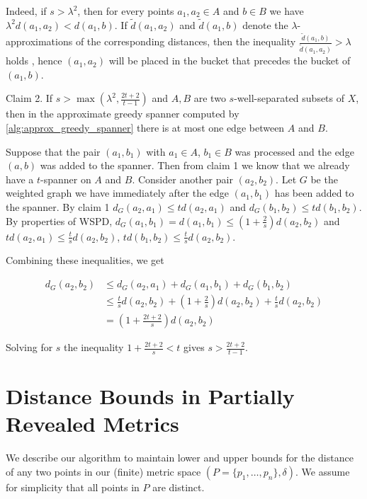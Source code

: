 \documentclass[10pt]{article}
\newcommand{\dappr}{\tilde{d}}
\newcommand{\metric}{\delta}
\begin{document}
Indeed, if $s > \lambda^2$, then for every points $a_1, a_2 \in A$ and $b \in B$
we have $\lambda^2 d(a_1, a_2) < d(a_1, b)$. If $\dappr(a_1, a_2)$ and $\dappr(a_1, b)$ denote the $\lambda$-approximations
of the corresponding distances, then the inequality $\frac{\dappr(a_1, b)}{\dappr(a_1, a_2)} > \lambda$
holds , hence $(a_1, a_2)$ will be placed in the bucket that precedes the bucket of $(a_1, b)$.


Claim 2. If $s > \max(\lambda^2, \frac{2t+2}{t-1})$ and $A, B$ are two $s$-well-separated subsets of $X$,
then in the approximate greedy spanner computed by \ref{alg:approx_greedy_spanner} there is at most one edge between $A$ and $B$.

Suppose that the pair $(a_1, b_1)$ with $a_1 \in A$, $b_1 \in B$ was processed and the edge $(a, b)$
was added to the spanner. Then from claim 1 we know that we already have a $t$-spanner on $A$ and $B$.
Consider another pair $(a_2, b_2)$. Let $G$ be the weighted graph we have immediately after the edge $(a_1, b_1)$ has been added
to the spanner. By claim 1
$d_G(a_2, a_1) \leq td(a_2, a_1)$ and $d_G(b_1, b_2) \leq t d(b_1, b_2)$.
By properties of WSPD, $d_G(a_1, b_1) = d(a_1, b_1) \leq (1 + \frac{2}{s})d(a_2, b_2)$
and $t d(a_2, a_1) \leq \frac{t}{s} d(a_2, b_2)$, $t d(b_1, b_2) \leq \frac{t}{s} d(a_2, b_2)$.

Combining these inequalities, we get

\begin{equation}
    \begin{split}
        d_G(a_2, b_2) & \leq  d_G(a_2, a_1) + d_G(a_1, b_1) + d_G(b_1, b_2)  \\
                      & \leq  \frac{t}{s} d(a_2, b_2) + (1 + \frac{2}{s})d(a_2, b_2) + \frac{t}{s} d(a_2, b_2) \\
                      & =     (1 + \frac{2t + 2}{s}) d(a_2, b_2)
    \end{split}
\end{equation}

Solving for $s$ the inequality $1 + \frac{2t + 2}{s} < t$ gives $s > \frac{2t+2}{t-1}$.


\section{Distance Bounds in Partially Revealed Metrics}
%
We describe our algorithm to maintain lower and upper bounds for the
distance of any two points in our (finite) metric space $(P=\{p_1,\ldots,p_n\},\metric)$. We assume for simplicity that all points in $P$ are distinct.
\end{document}
